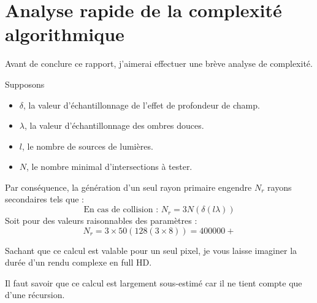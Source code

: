 \section{Analyse rapide de la complexité algorithmique}
Avant de conclure ce rapport, j'aimerai effectuer une brève analyse de
complexité.

Supposons
\begin{itemize}
  \item $\delta$, la valeur d'échantillonnage de l'effet de profondeur de champ.
  \item $\lambda$, la valeur d'échantillonnage des ombres douces.
  \item $l$, le nombre de sources de lumières.
  \item $N$, le nombre minimal d'intersections à tester.
\end{itemize}

Par conséquence, la génération d'un seul rayon primaire engendre $N_r$ rayons
secondaires tels que :
$$\mbox{En cas de collision : } N_r = 3 N (\delta (l \lambda))$$
Soit pour des valeurs raisonnables des paramètres : 
$$N_r = 3 \times 50 ( 128 ( 3 \times 8 )) = 400 000+$$

Sachant que ce calcul est valable pour un seul pixel, je vous laisse imaginer
la durée d'un rendu complexe en full HD.

Il faut savoir que ce calcul est largement sous-estimé car il ne tient compte
que d'une récursion.

